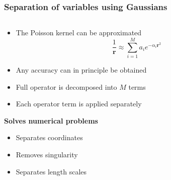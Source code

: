 \begin{frame}
    \frametitle{Separation of variables using Gaussians}
    \scriptsize


    \begin{columns}
    \begin{column}{.56\textwidth}
    \begin{itemize}
	\item The Poisson kernel can be approximated
	    \begin{equation}
		\nonumber
		\frac{1}{\boldsymbol{r}} \approx 
                \sum_{i=1}^M a_i e^{-\alpha_i \boldsymbol{r}^2} 
	    \end{equation}
	\item Any accuracy can in principle be obtained
	\item Full operator is decomposed into $M$ terms
	\item Each operator term is applied separately
    \end{itemize}

    \vspace{6mm}

    \pause\pause\pause\pause\pause\pause\pause
    \hspace{3mm} \textbf{Solves numerical problems}
    \begin{itemize}
	\item	Separates coordinates
	\item	Removes singularity
	\item	Separates length scales
    \end{itemize}


\end{column}
\end{columns}
\end{frame}
